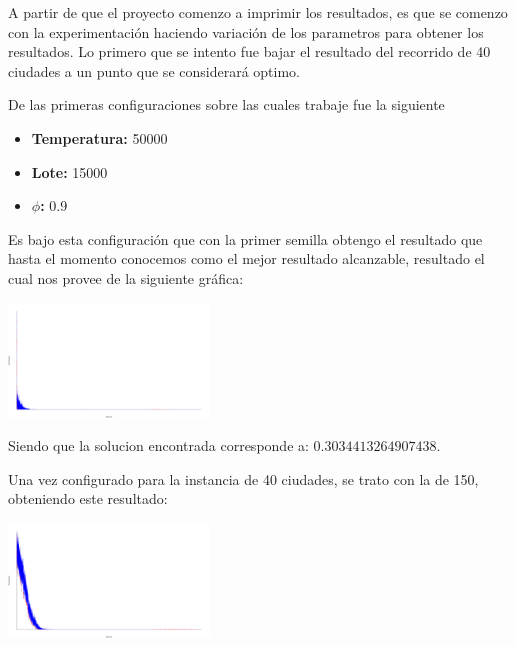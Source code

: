 \begin{multicols}{2}
A partir de que el proyecto comenzo a imprimir los resultados, es que se comenzo con la experimentación haciendo variación de los parametros para obtener los resultados. Lo primero que se intento fue bajar el resultado del recorrido de 40 ciudades a un punto que se considerará optimo.

De las primeras configuraciones sobre las cuales trabaje fue la siguiente

\begin{itemize}
\item \textbf{Temperatura:} 50000
\item \textbf{Lote: } 15000
\item \textbf{$\phi$: } 0.9
\end{itemize}

Es bajo esta configuración que con la primer semilla obtengo el resultado que hasta el momento conocemos como el mejor resultado alcanzable, resultado el cual nos provee de la siguiente gráfica:

\begin{center}
    \includegraphics[width=0.4\textwidth]{../svgs/40_documentable_semilla_1.pdf}
\end{center}

Siendo que la solucion encontrada corresponde a: $0.3034413264907438$.

Una vez configurado para la instancia de 40 ciudades, se trato con la de 150, obteniendo este resultado: 

\begin{center}
    \includegraphics[width=0.4\textwidth]{../svgs/150_documentable_semilla_82.pdf}
\end{center}


\end{multicols}
